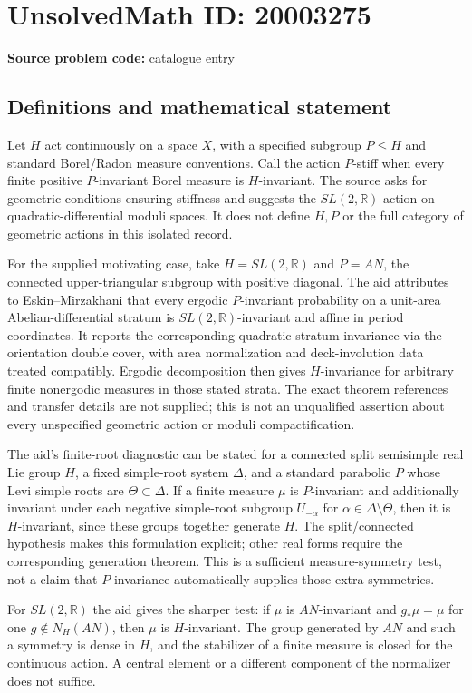 \documentclass[11pt]{article}
\newcommand{\R}{\mathbb{R}}
\begin{document}
\section*{UnsolvedMath ID: 20003275}
\textbf{Source problem code:} catalogue entry
\subsection{Definitions and mathematical statement}
Let $H$ act continuously on a space $X$, with a specified subgroup $P\leq H$ and standard Borel/Radon measure conventions. Call the action $P$-stiff when every finite positive $P$-invariant Borel measure is $H$-invariant. The source asks for geometric conditions ensuring stiffness and suggests the $SL(2,\R)$ action on quadratic-differential moduli spaces. It does not define $H,P$ or the full category of geometric actions in this isolated record.

For the supplied motivating case, take $H=SL(2,\R)$ and $P=AN$, the connected upper-triangular subgroup with positive diagonal. The aid attributes to Eskin--Mirzakhani that every ergodic $P$-invariant probability on a unit-area Abelian-differential stratum is $SL(2,\R)$-invariant and affine in period coordinates. It reports the corresponding quadratic-stratum invariance via the orientation double cover, with area normalization and deck-involution data treated compatibly. Ergodic decomposition then gives $H$-invariance for arbitrary finite nonergodic measures in those stated strata. The exact theorem references and transfer details are not supplied; this is not an unqualified assertion about every unspecified geometric action or moduli compactification.

The aid's finite-root diagnostic can be stated for a connected split semisimple real Lie group $H$, a fixed simple-root system $\Delta$, and a standard parabolic $P$ whose Levi simple roots are $\Theta\subset\Delta$. If a finite measure $\mu$ is $P$-invariant and additionally invariant under each negative simple-root subgroup $U_{-\alpha}$ for $\alpha\in\Delta\setminus\Theta$, then it is $H$-invariant, since these groups together generate $H$. The split/connected hypothesis makes this formulation explicit; other real forms require the corresponding generation theorem. This is a sufficient measure-symmetry test, not a claim that $P$-invariance automatically supplies those extra symmetries.

For $SL(2,\R)$ the aid gives the sharper test: if $\mu$ is $AN$-invariant and $g_*\mu=\mu$ for one $g\notin N_H(AN)$, then $\mu$ is $H$-invariant. The group generated by $AN$ and such a symmetry is dense in $H$, and the stabilizer of a finite measure is closed for the continuous action. A central element or a different component of the normalizer does not suffice.
\end{document}
